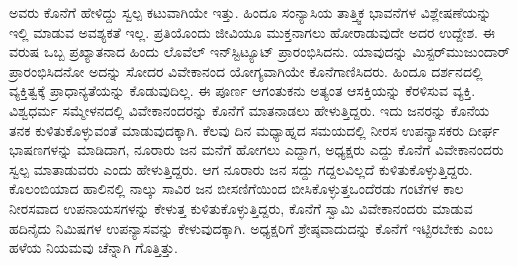 ಅವರು ಕೊನೆಗೆ ಹೇಳಿದ್ದು ಸ್ವಲ್ಪ ಕಟುವಾಗಿಯೇ ಇತ್ತು. ಹಿಂದೂ ಸಂನ್ಯಾಸಿಯ ತಾತ್ತ್ವಿಕ ಭಾವನೆಗಳ ವಿಶ್ಲೇಷಣೆಯನ್ನು ಇಲ್ಲಿ ಮಾಡುವ ಅವಶ್ಯಕತೆ ಇಲ್ಲ. ಪ್ರತಿಯೊಂದು ಜೀವಿಯೂ ಮುಕ್ತನಾಗಲು ಹೋರಾಡುವುದೇ ಅದರ ಉದ್ದೇಶ. ಈ ವರುಷ ಒಬ್ಬ ಪ್ರಖ್ಯಾತನಾದ ಹಿಂದು ಲೊವೆಲ್​ ಇನ್​ಸ್ಟಿಟ್ಯೂಟ್​ ಪ್ರಾರಂಭಿಸಿದನು. ಯಾವುದನ್ನು ಮಿಸ್ಟರ್​ ಮುಜುಂದಾರ್​ ಪ್ರಾರಂಭಿಸಿದನೋ ಅದನ್ನು ಸೋದರ ವಿವೇಕಾನಂದ ಯೋಗ್ಯವಾಗಿಯೇ ಕೊನೆಗಾಣಿಸಿದರು. ಹಿಂದೂ ದರ್ಶನದಲ್ಲಿ ವ್ಯಕ್ತಿತ್ವಕ್ಕೆ ಪ್ರಾಧಾನ್ಯತೆಯನ್ನು ಕೊಡುವುದಿಲ್ಲ. ಈ ಪೂರ್ಣ ಆಗಂತುಕನು ಅತ್ಯಂತ ಆಸಕ್ತಿಯನ್ನು ಕೆರಳಿಸುವ ವ್ಯಕ್ತಿ. ವಿಶ್ವಧರ್ಮ ಸಮ್ಮೇಳನದಲ್ಲಿ ವಿವೇಕಾನಂದರನ್ನು ಕೊನೆಗೆ ಮಾತನಾಡಲು ಹೇಳುತ್ತಿದ್ದರು. ಇದು ಜನರನ್ನು ಕೊನೆಯ ತನಕ ಕುಳಿತುಕೊಳ್ಳುವಂತೆ ಮಾಡುವುದಕ್ಕಾಗಿ. ಕೆಲವು ದಿನ ಮಧ್ಯಾಹ್ನದ ಸಮಯದಲ್ಲಿ ನೀರಸ ಉಪನ್ಯಾಸಕರು ದೀರ್ಘ ಭಾಷಣಗಳನ್ನು ಮಾಡಿದಾಗ, ನೂರಾರು ಜನ ಮನೆಗೆ ಹೋಗಲು ಎದ್ದಾಗ, ಅಧ್ಯಕ್ಷರು ಎದ್ದು ಕೊನೆಗೆ ವಿವೇಕಾನಂದರು ಸ್ವಲ್ಪ ಮಾತಾಡುವರು ಎಂದು ಹೇಳುತ್ತಿದ್ದರು. ಆಗ ನೂರಾರು ಜನ ಸದ್ದು ಗದ್ದಲವಿಲ್ಲದೆ ಕುಳಿತುಕೊಳ್ಳುತ್ತಿದ್ದರು. ಕೊಲಂಬಿಯಾದ ಹಾಲಿನಲ್ಲಿ ನಾಲ್ಕು ಸಾವಿರ ಜನ ಬೀಸಣಿಗೆಯಿಂದ ಬೀಸಿಕೊಳ್ಳುತ್ತ\break ಒಂದೆರಡು ಗಂಟೆಗಳ ಕಾಲ ನೀರಸವಾದ ಉಪನಾಯಸಗಳನ್ನು ಕೇಳುತ್ತ ಕುಳಿತುಕೊಳ್ಳುತ್ತಿದ್ದರು, ಕೊನೆಗೆ ಸ್ವಾಮಿ ವಿವೇಕಾನಂದರು ಮಾಡುವ ಹದಿನೈದು ನಿಮಿಷಗಳ ಉಪನ್ಯಾಸವನ್ನು ಕೇಳುವುದಕ್ಕಾಗಿ. ಅಧ್ಯಕ್ಷರಿಗೆ ಶ್ರೇಷ್ಠವಾದುದನ್ನು ಕೊನೆಗೆ ಇಟ್ಟಿರಬೇಕು ಎಂಬ ಹಳೆಯ ನಿಯಮವು ಚೆನ್ನಾಗಿ ಗೊತ್ತಿತ್ತು.


